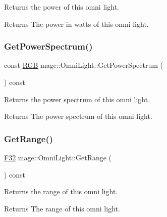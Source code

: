 Returns the power of this omni light.

\begin{DoxyReturn}{Returns}
The power in watts of this omni light. 
\end{DoxyReturn}
\hypertarget{classmage_1_1_omni_light_a17a0de3d22bfd3dcb2480f516009d885}{}\label{classmage_1_1_omni_light_a17a0de3d22bfd3dcb2480f516009d885} 
\subsubsection{\texorpdfstring{Get\+Power\+Spectrum()}{GetPowerSpectrum()}}
{\footnotesize\ttfamily const \hyperlink{structmage_1_1_r_g_b}{R\+GB} mage\+::\+Omni\+Light\+::\+Get\+Power\+Spectrum (\begin{DoxyParamCaption}{ }\end{DoxyParamCaption}) const\hspace{0.3cm}{\ttfamily [noexcept]}}

Returns the power spectrum of this omni light.

\begin{DoxyReturn}{Returns}
The power spectrum of this omni light. 
\end{DoxyReturn}
\hypertarget{classmage_1_1_omni_light_a1c829777c2afc850dd66382bc0115d8d}{}\label{classmage_1_1_omni_light_a1c829777c2afc850dd66382bc0115d8d} 
\subsubsection{\texorpdfstring{Get\+Range()}{GetRange()}}
{\footnotesize\ttfamily \hyperlink{namespacemage_aa97e833b45f06d60a0a9c4fc22ae02c0}{F32} mage\+::\+Omni\+Light\+::\+Get\+Range (\begin{DoxyParamCaption}{ }\end{DoxyParamCaption}) const\hspace{0.3cm}{\ttfamily [noexcept]}}

Returns the range of this omni light.

\begin{DoxyReturn}{Returns}
The range of this omni light. 
\end{DoxyReturn}
\hypertarget{classmage_1_1_omni_light_abae044c80634cfc6d15a0e21e7a55b5d}{}\label{classmage_1_1_omni_light_abae044c80634cfc6d15a0e21e7a55b5d} 
